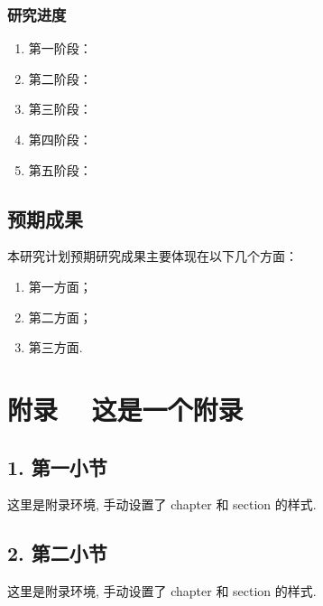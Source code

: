 \documentclass{phdproposal}
\begin{document}
\subsection{研究进度}

\begin{enumerate}
\setlength{\itemsep}{0pt}
  \item [] 第一阶段：
  \item [] 第二阶段：
  \item [] 第三阶段：
  \item [] 第四阶段：
  \item [] 第五阶段：
\end{enumerate}



\section{预期成果}

本研究计划预期研究成果主要体现在以下几个方面：
\begin{enumerate}[label=(\arabic*)]
\setlength{\itemsep}{0pt}
  \item 第一方面；
  \item 第二方面；
  \item 第三方面.
\end{enumerate}





\backmatter  %



% 
% 





\appendix

\renewcommand{\chaptermark}[1]{\markboth{#1}{}}
\chapter{附录 ~ 这是一个附录}
\section*{1. 第一小节}

这里是附录环境, 手动设置了 chapter 和 section 的样式.

\section*{2. 第二小节}

这里是附录环境, 手动设置了 chapter 和 section 的样式.
\end{document}
